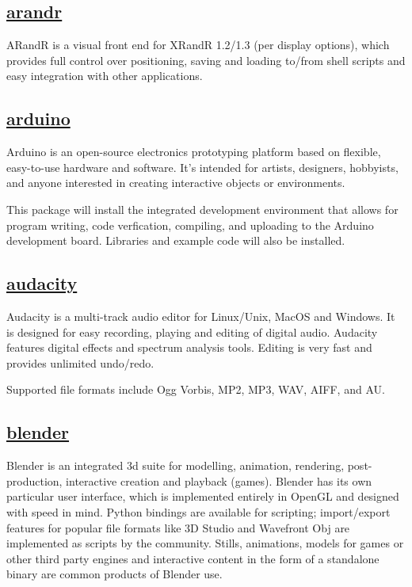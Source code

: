 \subsection{\href{http://christian.amsuess.com/tools/arandr/}{arandr}}

 ARandR is a visual front end for XRandR 1.2/1.3 (per display options), which
 provides full control over positioning, saving and loading to/from shell
 scripts and easy integration with other applications.

\subsection{\href{http://www.arduino.cc}{arduino}}

 Arduino is an open-source electronics prototyping platform based on
 flexible, easy-to-use hardware and software. It's intended for artists,
 designers, hobbyists, and anyone interested in creating interactive
 objects or environments.
 
 This package will install the integrated development environment that
 allows for program writing, code verfication, compiling, and uploading
 to the Arduino development board. Libraries and example code will also
 be installed.

\subsection{\href{http://audacity.sourceforge.net/}{audacity}}

 Audacity is a multi-track audio editor for Linux/Unix, MacOS and
 Windows.  It is designed for easy recording, playing and editing of
 digital audio.  Audacity features digital effects and spectrum
 analysis tools.  Editing is very fast and provides unlimited
 undo/redo.
 
 Supported file formats include Ogg Vorbis, MP2, MP3, WAV, AIFF, and AU.

\subsection{\href{http://www.blender.org/}{blender}}

 Blender is an integrated 3d suite for modelling, animation, rendering,
 post-production, interactive creation and playback (games). Blender has its
 own particular user interface, which is implemented entirely in OpenGL and
 designed with speed in mind. Python bindings are available for scripting;
 import/export features for popular file formats like 3D Studio and Wavefront
 Obj are implemented as scripts by the community. Stills, animations, models
 for games or other third party engines and interactive content in the form of
 a standalone binary are common products of Blender use.

